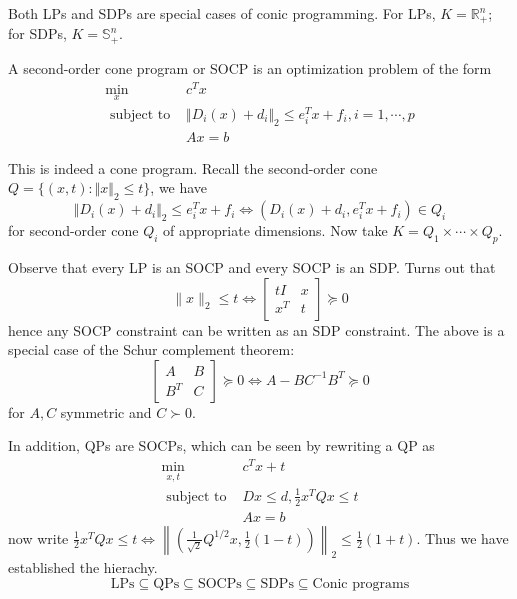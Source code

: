 \documentclass[a4paper]{article}
\begin{document}
{\noindent Both LPs and SDPs are special cases of conic programming. For LPs, $K = \mathbb{R}^n_+$; for SDPs, $K = \mathbb{S}^n_+$.

\begin{defi}
  A second-order cone program or SOCP is an optimization problem of the form
  \[
  \begin{array}{ll}
      \min\limits_{x} & c^T x \\
      \text { subject to } & \Vert D_i(x) + d_i \Vert_2 \leq e_i^T x + f_i, i=1, \cdots, p \\ \nonumber
      & Ax = b
  \end{array} 
  \]
\end{defi}

\noindent This is indeed a cone program. Recall the second-order cone $Q = \{(x,t): \Vert x \Vert_2 \leq t \}$, we have 
\begin{equation}
  \Vert D_i(x) + d_i \Vert_2 \leq e_i^T x + f_i \Longleftrightarrow (D_i(x) + d_i, e_i^T x + f_i) \in Q_i \nonumber
\end{equation}
for second-order cone $Q_i$ of appropriate dimensions. Now take $K = Q_1 \times \cdots \times Q_p$.

\noindent Observe that every LP is an SOCP and every SOCP is an SDP. Turns out that 
\begin{equation}
  \|x\|_{2} \leq t \Longleftrightarrow\left[\begin{array}{cc}t I & x \\x^{T} & t\end{array}\right] \succeq 0 \nonumber 
\end{equation}
hence any SOCP constraint can be written as an SDP constraint. The above is a special case of the Schur complement theorem: 
\begin{equation}
  \left[\begin{array}{cc}A & B \\B^{T} & C\end{array}\right] \succeq 0 \Longleftrightarrow A-B C^{-1} B^{T} \succeq 0 \nonumber
\end{equation}
for $A, C$ symmetric and $C \succ  0$.

\noindent In addition, QPs are SOCPs, which can be seen by rewriting a QP as
\begin{equation}
  \begin{array}{ll}
    \min\limits_{x, t} & c^T x + t \\
    \text { subject to } &  Dx \leq d, \frac{1}{2}x^TQx \leq t \\ \nonumber
    & Ax = b
\end{array} 
\end{equation}
now write $\frac{1}{2}x^TQx \leq t \Leftrightarrow  \left\|\left(\frac{1}{\sqrt{2}} Q^{1 / 2} x, \frac{1}{2}(1-t)\right)\right\|_{2} \leq \frac{1}{2}(1+t)$. Thus we have established the hierachy.
\begin{equation}
  \text{LPs} \subseteq \text{QPs} \subseteq \text{SOCPs} \subseteq \text{SDPs} \subseteq \text{Conic programs} \nonumber
\end{equation}

}
\end{document}
